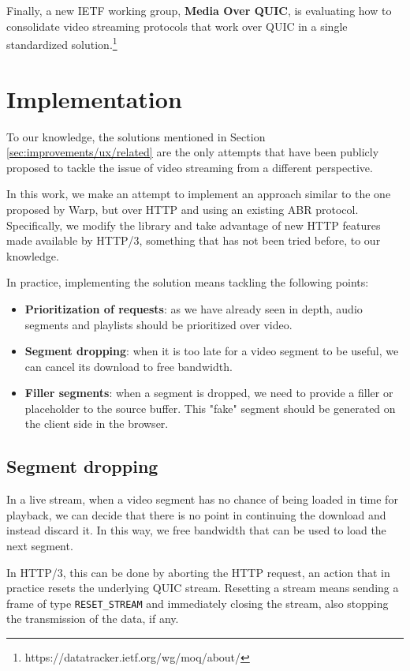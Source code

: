 Finally, a new IETF working group, \textbf{Media Over QUIC}, is evaluating how to consolidate video streaming protocols that work over QUIC in a single standardized solution.\footnote{https://datatracker.ietf.org/wg/moq/about/}

\section{Implementation}
\label{sec:improvements/impl}

To our knowledge, the solutions mentioned in Section \ref{sec:improvements/ux/related} are the only attempts that have been publicly proposed to tackle the issue of video streaming from a different perspective.

In this work, we make an attempt to implement an approach similar to the one proposed by Warp, but over HTTP and using an existing ABR protocol. Specifically, we modify the \hlsjs{} library and take advantage of new HTTP features made available by HTTP/3, something that has not been tried before, to our knowledge.

In practice, implementing the solution means tackling the following points:

\begin{itemize}
    \item \textbf{Prioritization of requests}: as we have already seen in depth, audio segments and playlists should be prioritized over video.
    \item \textbf{Segment dropping}: when it is too late for a video segment to be useful, we can cancel its download to free bandwidth.
    \item \textbf{Filler segments}: when a segment is dropped, we need to provide a filler or placeholder to the source buffer. This "fake" segment should be generated on the client side in the browser.
\end{itemize}

\subsection{Segment dropping}
\label{sec:improvements/impl/dropping}

In a live stream, when a video segment has no chance of being loaded in time for playback, we can decide that there is no point in continuing the download and instead discard it. In this way, we free bandwidth that can be used to load the next segment.

In HTTP/3, this can be done by aborting the HTTP request, an action that in practice resets the underlying QUIC stream. Resetting a stream means sending a frame of type \texttt{RESET\_STREAM} and immediately closing the stream, also stopping the transmission of the data, if any.

